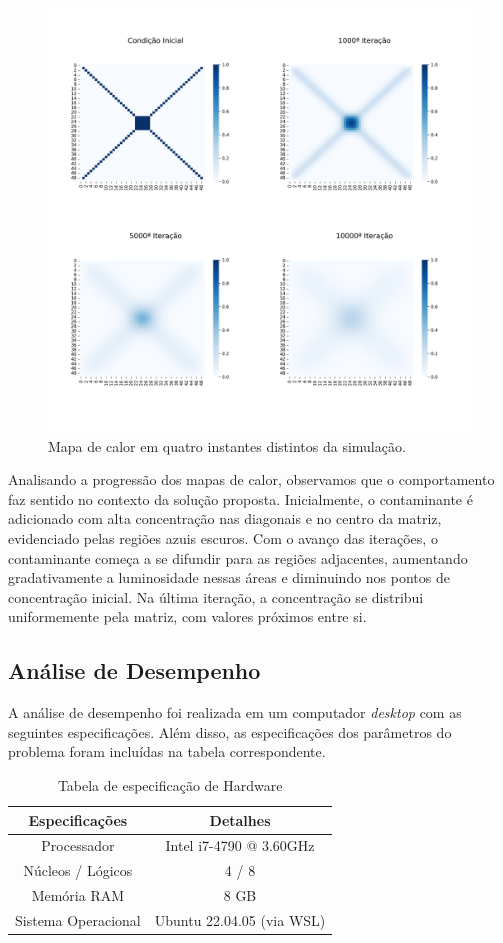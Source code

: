 \documentclass[12pt]{article}
\begin{document}
\begin{figure}[ht]
\centering
\includegraphics[width=.7\textwidth]{figs/heatmap.png}
\caption{Mapa de calor em quatro instantes distintos da simulação.}
\label{fig:heatmap}
\end{figure}

Analisando a progressão dos mapas de calor, observamos que o comportamento faz sentido no contexto da solução proposta. Inicialmente, o contaminante é adicionado com alta concentração nas diagonais e no centro da matriz, evidenciado pelas regiões azuis escuros. Com o avanço das iterações, o contaminante começa a se difundir para as regiões adjacentes, aumentando gradativamente a luminosidade nessas áreas e diminuindo nos pontos de concentração inicial. Na última iteração, a concentração se distribui uniformemente pela matriz, com valores próximos entre si.

\subsection{Análise de Desempenho}

A análise de desempenho foi realizada em um computador \textit{desktop} com as seguintes especificações. Além disso, as especificações dos parâmetros do problema foram incluídas na tabela correspondente.

\begin{table}[ht]
\centering
\caption{Tabela de especificação de Hardware}
\vspace{0.3cm}
\begin{tabular}{||c c||} 
 \hline
Especificações & Detalhes \\ [0.5ex] 
 \hline\hline
 Processador & Intel i7-4790 @ 3.60GHz \\ 
 \hline
 Núcleos / Lógicos & 4 / 8  \\
 \hline
 Memória RAM & 8 GB  \\
 \hline
 Sistema Operacional & Ubuntu 22.04.05 (via WSL)   \\ 
 \hline
\end{tabular}
\end{table}
\end{document}
